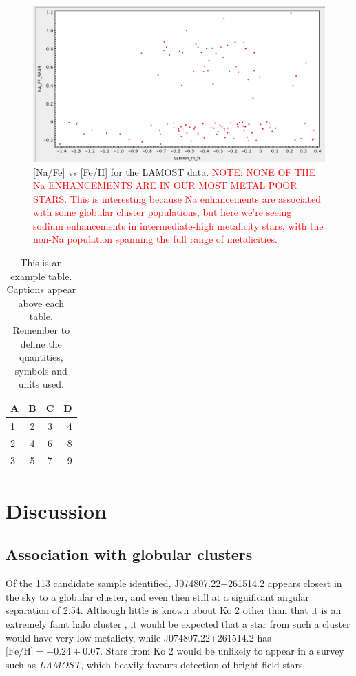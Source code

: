 \documentclass[a4paper,fleqn,usenatbib]{mnras}
\newcommand{\todo}[1]{\textcolor{red}{#1}}
\newcommand{\project}[1]{\emph{#1}}
\newcommand{\lamost}{\project{LAMOST}}
\begin{document}
\begin{figure}
	\includegraphics[width=\columnwidth]{NavsFe.png}
    \caption{[Na/Fe] vs [Fe/H] for the LAMOST data. \todo{NOTE: NONE OF THE Na ENHANCEMENTS ARE IN OUR MOST METAL POOR STARS. This is interesting because Na enhancements are associated with some globular cluster populations, but here we're seeing sodium enhancements in intermediate-high metalicity stars, with the non-Na population spanning the full range of metalicities.}}
    \label{NavsFe}
\end{figure}

\begin{table}
	\centering
	\caption{This is an example table. Captions appear above each table.
	Remember to define the quantities, symbols and units used.}
	\label{tab:example_table}
	\begin{tabular}{lccr} %
		\hline
		A & B & C & D\\
		\hline
		1 & 2 & 3 & 4\\
		2 & 4 & 6 & 8\\
		3 & 5 & 7 & 9\\
		\hline
	\end{tabular}
\end{table}

\section{Discussion}
\subsection{Association with globular clusters}

Of the 113 candidate sample identified, J074807.22+261514.2 appears closest in the sky to a globular cluster, and even then still at a significant angular separation of 2.54\degree . Although little is known about Ko 2 other than that it is an extremely faint halo cluster \citep{koposov2007}, it would be expected that a star from such a cluster would have very low metalicty, while J074807.22+261514.2 has $ \text{[Fe/H]} = -0.24 \pm 0.07$. Stars from Ko 2 would be unlikely to appear in a survey such as \lamost, which heavily favours detection of bright field stars.
\end{document}
